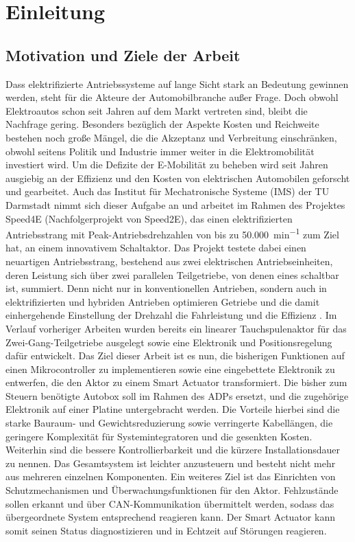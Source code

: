 \chapter{Einleitung}\label{kap1}
\section{Motivation und Ziele der Arbeit}
Dass elektrifizierte Antriebssysteme auf lange Sicht stark an Bedeutung gewinnen werden, steht für die Akteure der Automobilbranche außer Frage. Doch obwohl Elektroautos schon seit Jahren auf dem Markt vertreten sind, bleibt die Nachfrage gering. Besonders bezüglich der Aspekte Kosten und Reichweite bestehen noch große Mängel, die die Akzeptanz und Verbreitung einschränken, obwohl seitens Politik und Industrie immer weiter in die Elektromobilität investiert wird. Um die Defizite der E-Mobilität zu beheben wird seit Jahren ausgiebig an der Effizienz und den Kosten von elektrischen Automobilen geforscht und gearbeitet.
Auch das Institut für Mechatronische Systeme (IMS) der TU Darmstadt nimmt sich dieser Aufgabe an und arbeitet im Rahmen des Projektes Speed4E (Nachfolgerprojekt von Speed2E), das einen elektrifizierten Antriebsstrang mit Peak-Antriebsdrehzahlen von bis zu \SI{50.000}{min^{-1}} zum Ziel hat, an einem innovativem Schaltaktor. Das Projekt testete dabei einen neuartigen Antriebsstrang, bestehend aus zwei elektrischen Antriebseinheiten, deren Leistung sich über zwei parallelen Teilgetriebe, von denen eines schaltbar ist, summiert. Denn nicht nur in konventionellen Antrieben, sondern auch in elektrifizierten und hybriden Antrieben optimieren Getriebe und die damit einhergehende Einstellung der Drehzahl die Fahrleistung und die Effizienz \cite{Tsch14}.
  Im Verlauf vorheriger Arbeiten wurden bereits ein linearer Tauchspulenaktor für das Zwei-Gang-Teilgetriebe ausgelegt sowie eine Elektronik und Positionsregelung dafür entwickelt. Das Ziel dieser Arbeit ist es nun, die bisherigen Funktionen auf einen Mikrocontroller zu implementieren sowie eine eingebettete Elektronik zu entwerfen, die den Aktor zu einem Smart Actuator transformiert. Die bisher zum Steuern benötigte Autobox soll im Rahmen des ADPs ersetzt, und die zugehörige Elektronik auf einer Platine untergebracht werden. Die Vorteile hierbei sind die starke Bauraum- und Gewichtsreduzierung sowie verringerte Kabellängen, die geringere Komplexität für Systemintegratoren und die gesenkten Kosten. Weiterhin sind die bessere Kontrollierbarkeit und die kürzere Installationsdauer zu nennen. Das Gesamtsystem ist leichter anzusteuern und besteht nicht mehr aus mehreren einzelnen Komponenten. Ein weiteres Ziel ist das Einrichten von Schutzmechanismen und Überwachungsfunktionen für den Aktor. Fehlzustände sollen erkannt und über CAN-Kommunikation übermittelt werden, sodass das übergeordnete System entsprechend reagieren kann. Der Smart Actuator kann somit seinen Status diagnostizieren und in Echtzeit auf Störungen reagieren.  

